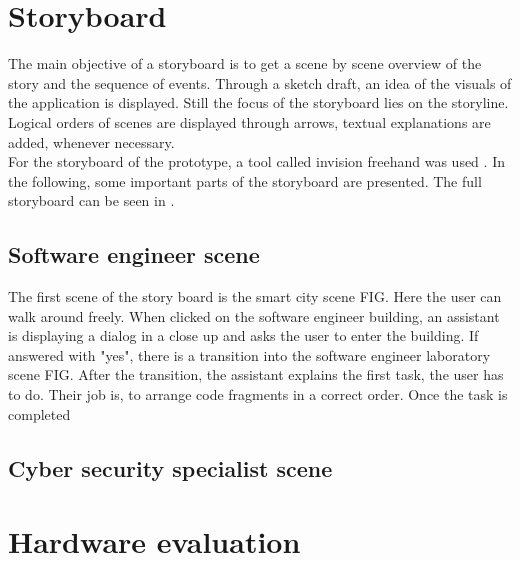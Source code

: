 \section{Storyboard}
The main objective of a storyboard is to get a scene by scene overview of the story and the sequence of events. Through a sketch draft, an idea of the visuals of the application is displayed. Still the focus of the storyboard lies on the storyline. Logical orders of scenes are displayed through arrows, textual explanations are added, whenever necessary.\\
For the storyboard of the prototype, a tool called invision freehand was used \cite{TODO}. In the following, some important parts of the storyboard are presented. The full storyboard can be seen in \cite{TODO}.
\subsection{Software engineer scene}
The first scene of the story board is the smart city scene FIG. Here the user can walk around freely. When clicked on the software engineer building, an assistant is displaying a dialog in a close up and asks the user to enter the building. If answered with "yes", there is a transition into the software engineer laboratory scene FIG. After the transition, the assistant explains the first task, the user has to do. Their job is, to arrange code fragments in a correct order. Once the task is completed

\subsection{Cyber security specialist scene}


\section{Hardware evaluation}